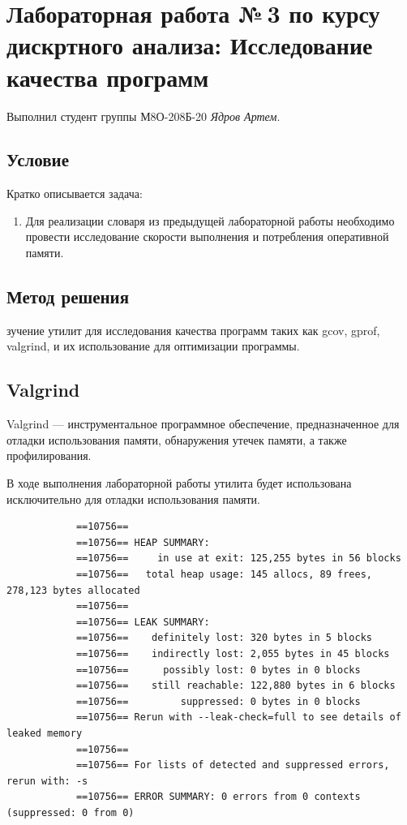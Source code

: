 \documentclass[12pt]{article}
\begin{document}
	
	\section*{Лабораторная работа №\,3 по курсу дискртного анализа: Исследование качества программ}
	
	Выполнил студент группы М8О-208Б-20 \textit{Ядров Артем}.
	
	\subsection*{Условие}
	
	Кратко описывается задача: 
	\begin{enumerate}
		\item Для реализации словаря из предыдущей лабораторной работы необходимо провести исследование скорости выполнения и потребления оперативной памяти.
	\end{enumerate}
	
	\subsection*{Метод решения}
	
	зучение утилит для исследования качества программ таких как gcov, gprof, valgrind, и их использование для оптимизации программы.
	
	\subsection*{Valgrind}
	
	Valgrind — инструментальное программное обеспечение, предназначенное для отладки использования памяти, обнаружения утечек памяти, а также профилирования.
	
	В ходе выполнения лабораторной работы утилита будет использована исключительно для отладки использования памяти.
	
	\begin{small}
		\footnotesize
		\begin{verbatim}
			==10756== 
			==10756== HEAP SUMMARY:
			==10756==     in use at exit: 125,255 bytes in 56 blocks
			==10756==   total heap usage: 145 allocs, 89 frees, 278,123 bytes allocated
			==10756== 
			==10756== LEAK SUMMARY:
			==10756==    definitely lost: 320 bytes in 5 blocks
			==10756==    indirectly lost: 2,055 bytes in 45 blocks
			==10756==      possibly lost: 0 bytes in 0 blocks
			==10756==    still reachable: 122,880 bytes in 6 blocks
			==10756==         suppressed: 0 bytes in 0 blocks
			==10756== Rerun with --leak-check=full to see details of leaked memory
			==10756== 
			==10756== For lists of detected and suppressed errors, rerun with: -s
			==10756== ERROR SUMMARY: 0 errors from 0 contexts (suppressed: 0 from 0)
		\end{verbatim}
	\end{small}
\end{document}

